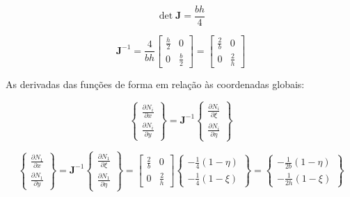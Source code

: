     \begin{equation}
        \det \mathbf{J} = 
        \frac{bh}{4}
    \end{equation}

    \begin{equation}
        \mathbf{J}^{-1} = 
        \frac{4}{bh}\begin{bmatrix}
                \frac{h}{2} &  0\\
                0 &  \frac{b}{2}
        \end{bmatrix}=
        \begin{bmatrix}
                \frac{2}{b} &  0\\
                0 &  \frac{2}{h}
        \end{bmatrix}
    \end{equation}

    As derivadas das funções de forma em relação às coordenadas globais:

    \begin{equation}
        \begin{Bmatrix}
            \frac{\partial N_i}{\partial x} \\
            \frac{\partial N_i}{\partial y}
        \end{Bmatrix} = 
        \mathbf{J}^{-1}
        \begin{Bmatrix}
            \frac{\partial N_i}{\partial \xi} \\
            \frac{\partial N_i}{\partial \eta}
        \end{Bmatrix}
    \end{equation}


    \begin{equation}
        \begin{Bmatrix}
            \frac{\partial N_1}{\partial x} \\
            \frac{\partial N_1}{\partial y}
        \end{Bmatrix} = 
        \mathbf{J}^{-1}
        \begin{Bmatrix}
            \frac{\partial N_1}{\partial \xi} \\
            \frac{\partial N_1}{\partial \eta}
        \end{Bmatrix}=
        \begin{bmatrix}
                \frac{2}{b} &  0\\
                0 &  \frac{2}{h}
        \end{bmatrix}
        \begin{Bmatrix}
            -\frac{1}{4}\left(1-\eta\right) \\
            -\frac{1}{4}\left(1-\xi\right)
        \end{Bmatrix}=
        \begin{Bmatrix}
            -\frac{1}{2b}\left(1-\eta\right) \\
            -\frac{1}{2h}\left(1-\xi\right)
        \end{Bmatrix}
    \end{equation}

